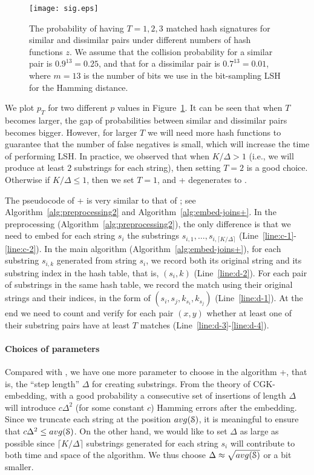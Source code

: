 \begin{figure}[t]
\centering
\texttt{[image: sig.eps]}
\caption{The probability of having $T=1,2,3$ matched hash signatures for similar and dissimilar pairs under different numbers of hash functions $z$.  We assume that the collision probability for a similar pair is $0.9^{13} = 0.25$, and that for a dissimilar pair is $0.7^{13} = 0.01$, where $m = 13$ is the number of bits we use in the bit-sampling LSH for the Hamming distance.}
\label{fig:numsig}
\end{figure}

We plot $p_T$ for two different $p$ values in Figure~\ref{fig:numsig}.  It can be seen that when $T$ becomes larger, the gap of probabilities between similar and dissimilar pairs becomes bigger.  However, for larger $T$ we will need more hash functions to guarantee that the number of false negatives is small, which will increase the time of performing LSH.  In practice, we observed that when $K/\Delta > 1$ (i.e., we will produce at least $2$ substrings for each string), then setting $T = 2$ is a good choice.  Otherwise if $K/\Delta \le 1$,  then we set $T = 1$, and \ebdjoin+ degenerates to \ebdjoin.



The pseudocode of \ebdjoin+ is very similar to that of \ebdjoin; see Algorithm~\ref{alg:preprocessing2} and Algorithm~\ref{alg:embed-joins+}.  In the preprocessing (Algorithm~\ref{alg:preprocessing2}), the only difference is that we need to embed for each string $s_i$ the substrings $s_{i,1}, \ldots, s_{i,{\lceil K/\Delta \rceil}}$ (Line~\ref{line:c-1}-\ref{line:c-2}). In the main algorithm (Algorithm~\ref{alg:embed-joins+}), for each substring $s_{i,k}$ generated from string $s_i$, we record both its original string and its substring index in the hash table, that is, $(s_i, k)$ (Line~\ref{line:d-2}).  For each pair of substrings in the same hash table, we record the match using their original strings and their indices, in the form of $(s_i, s_j, k_{s_i}, k_{s_j})$ (Line~\ref{line:d-1}).  At the end we need to count and verify for each pair $(x, y)$ whether at least one of their substring pairs have at least $T$ matches (Line~\ref{line:d-3}-\ref{line:d-4}).

\paragraph{Choices of parameters}
Compared with \ebdjoin, we have one more parameter to choose in the algorithm \ebdjoin+, that is, the ``step length'' $\Delta$ for creating substrings.  From the theory of CGK-embedding, with a good probability a consecutive set of insertions of length $\Delta$ will introduce $c \Delta^2$ (for some constant $c$) Hamming errors after the embedding.  Since we truncate each string at the position $avg(\S)$, it is meaningful to ensure that $c \Delta^2 \le avg(\S)$. On the other hand, we would like to set $\Delta$ as large as possible since $\lceil K/\Delta \rceil$ substrings generated for each string $s_i$ will contribute to both time and space of the algorithm. We thus choose $\Delta \approx \sqrt{avg(\S)}$ or a bit smaller.   

